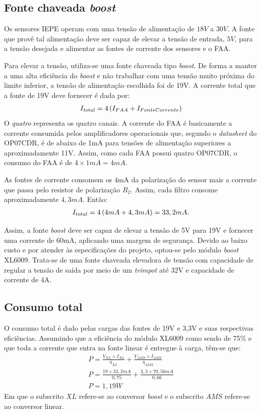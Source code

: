 \documentclass[
	12pt,				%
	openright,			%
	twoside,			%
	a4paper,			%
	english,			%
	french,				%
	spanish,			%
	brazil,				%
	]{abntex2}
\begin{document}
		\subsection{Fonte chaveada \textit{boost}}
			Os sensores IEPE operam com uma tensão de alimentação de $18V$ a
			$30V$. A fonte que provê tal alimentação deve ser capaz de
			elevar a tensão de entrada, $5V$, para a tensão desejada e
			alimentar as fontes de corrente dos sensores e o FAA.
			
			Para elevar a tensão, utiliza-se uma fonte chaveada tipo
			\textit{boost}. De forma a manter a uma alta eficiência do
			\textit{boost} e não trabalhar com uma tensão muito próxima do
			limite inferior, a tensão de alimentação escolhida foi de 19V.
			A corrente total que a fonte de 19V deve fornecer é dada por:
			\begin{gather*}
				I_{total} = 4\* \left(I_{FAA} + I_{FonteCorrente}\right)
			\end{gather*}
			O \textit{quatro} representa os quatro canais. A corrente do FAA
			é basicamente a corrente consumida pelos amplificadores
			operacionais que, segundo o \textit{datasheet} do OP07CDR, é de
			abaixo de 1mA para tensões de alimentação superiores a
			aproximadamente 11V. Assim, como cada FAA possui quatro OP07CDR,
			o consumo do FAA é de $4\times 1mA =  4mA$.

			As fontes de corrente consomem os 4mA da polarização do sensor
			mais a corrente que passa pelo resistor de polarização $R_2$.
			Assim, cada filtro consome aproximadamente $4,3mA$. Então:
			\begin{gather*}
				I_{total} = 4\* \left(4mA + 4,3mA\right) = 33,2mA.
			\end{gather*}

			Assim, a fonte \textit{boost} deve ser capaz de elevar a tensão
			de 5V para 19V e fornecer uma corrente de 60mA, aplicando uma
			margem de segurança. Devido ao baixo custo e por atender às
			especificações do projeto, optou-se pelo módulo \textit{boost}
			XL6009. Trata-se de uma fonte chaveada elevadora de tensão com
			capacidade de regular a tensão de saída por meio de um
			\textit{trimpot} até 32V e capacidade de corrente de 4A.
			
		\subsection{Consumo total}
			O consumo total é dado pelas cargas das fontes de 19V e 3,3V e
			suas respectivas eficiências. Assumindo que a eficiência do
			módulo XL6009 como sendo de 75\% e que toda a corrente que entra
			na fonte linear é entregue à carga, têm-se que:
			\begin{gather*}
				P = \frac{V_{XL}\times I_{XL}}{\eta _{XL}} + \frac{V_{AMS}\times I_{AMS}}{\eta _{AMS}}\\
				P = \frac{19\times 33,2mA}{0,75} + \frac{3,3\times 70,56mA}{0,66}\\
				P = 1,19W
			\end{gather*}
			Em que o subscrito $XL$ refere-se ao conversor \textit{boost} e
			o subscrito $AMS$ refere-se ao conversor linear.
\end{document}
